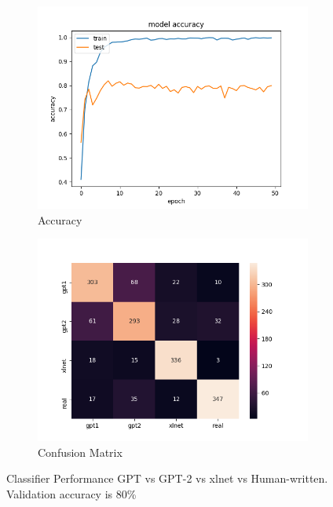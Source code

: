 \documentclass[11pt,letterpaper]{article}
\begin{document}
\begin{figure}[h!]
        \centering
        \begin{subfigure}[b]{1.0\linewidth}
                \centering
                \includegraphics[width=0.7\linewidth]{accuracy_vs_epochs_all.png}
                \caption{Accuracy}
        \end{subfigure}
        \begin{subfigure}[b]{1.0\linewidth}
                \centering
                \includegraphics[width=0.7\linewidth]{sns_heatmap_all.png}
                \caption{Confusion Matrix}
        \end{subfigure}
        \caption{Classifier Performance GPT vs GPT-2 vs xlnet vs Human-written. Validation accuracy is 80\%}
        \label{fig:prob6.4}
\end{figure}
\end{document}
